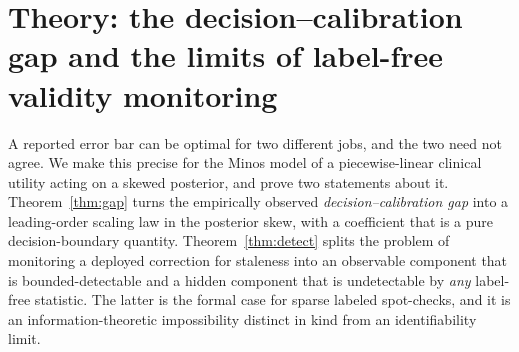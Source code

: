 %
%

\section{Theory: the decision--calibration gap and the limits of label-free validity monitoring}
\label{sec:theory}

A reported error bar can be optimal for two different jobs, and the two need not agree. We make this
precise for the Minos model of a piecewise-linear clinical utility acting on a skewed posterior, and
prove two statements about it. Theorem~\ref{thm:gap} turns the empirically observed
\emph{decision--calibration gap} into a leading-order scaling law in the posterior skew, with a
coefficient that is a pure decision-boundary quantity. Theorem~\ref{thm:detect} splits the problem of
monitoring a deployed correction for staleness into an observable component that is
bounded-detectable and a hidden component that is undetectable by \emph{any} label-free statistic.
The latter is the formal case for sparse labeled spot-checks, and it is an information-theoretic
impossibility distinct in kind from an identifiability limit.

